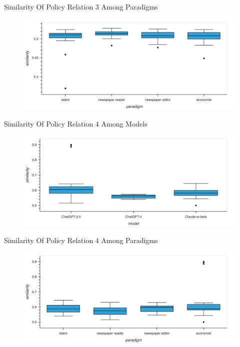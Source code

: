 \documentclass[12pt]{beamer}
\begin{document}
\begin{frame}{Similarity Of Policy Relation 3 Among Paradigms}
\begin{figure}[H]
\centering
\includegraphics[width=11.5cm]{Figures/fig32.png}
\end{figure}
\end{frame}


\begin{frame}{Similarity Of Policy Relation 4 Among Models}
\begin{figure}[H]
\centering
\includegraphics[width=11.5cm]{Figures/fig33.png}
\end{figure}
\end{frame}


\begin{frame}{Similarity Of Policy Relation 4 Among Paradigms}
\begin{figure}[H]
\centering
\includegraphics[width=11.5cm]{Figures/fig34.png}
\end{figure}
\end{frame}
\end{document}
